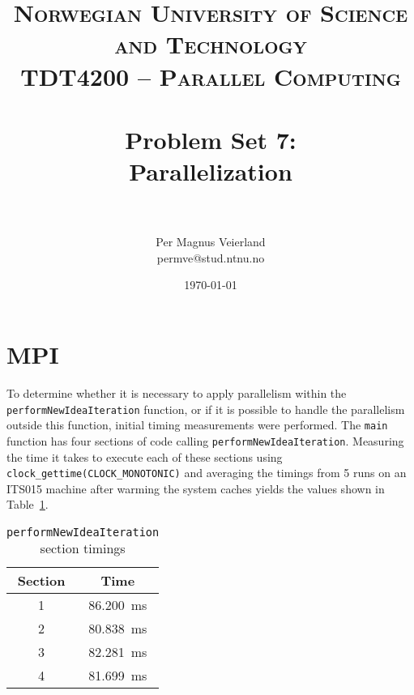 

\usepackage[htt]{hyphenat}

\title{	
\normalfont \normalsize 
\textsc{Norwegian University of Science and Technology\\TDT4200 -- Parallel Computing} \\ [25pt]
\horrule{0.5pt} \\[0.4cm]
\huge Problem Set 7:\\ Parallelization\\
\horrule{2pt} \\[0.5cm]
}

\author{Per Magnus Veierland\\permve@stud.ntnu.no}


\date{\normalsize\today}




\maketitle

\section*{\ac{MPI}}

To determine whether it is necessary to apply parallelism within the \texttt{performNewIdeaIteration} function, or if it is possible to handle the parallelism outside this function, initial timing measurements were performed. The \texttt{main} function has four sections of code calling \texttt{performNewIdeaIteration}. Measuring the time it takes to execute each of these sections using \texttt{clock\_gettime(CLOCK\_MONOTONIC)} and averaging the timings from 5 runs on an \textsc{ITS015} machine after warming the system caches yields the values shown in Table~\ref{table:mpiz}.

\begin{table}
\centering
\begin{tabular}{cc}
\toprule
Section & Time \\
\midrule
1 & 86.200~ms \\
2 & 80.838~ms \\
3 & 82.281~ms \\
4 & 81.699~ms\\
\bottomrule
\end{tabular}
\caption{\texttt{performNewIdeaIteration} section timings}
\label{table:mpiz}
\end{table}

